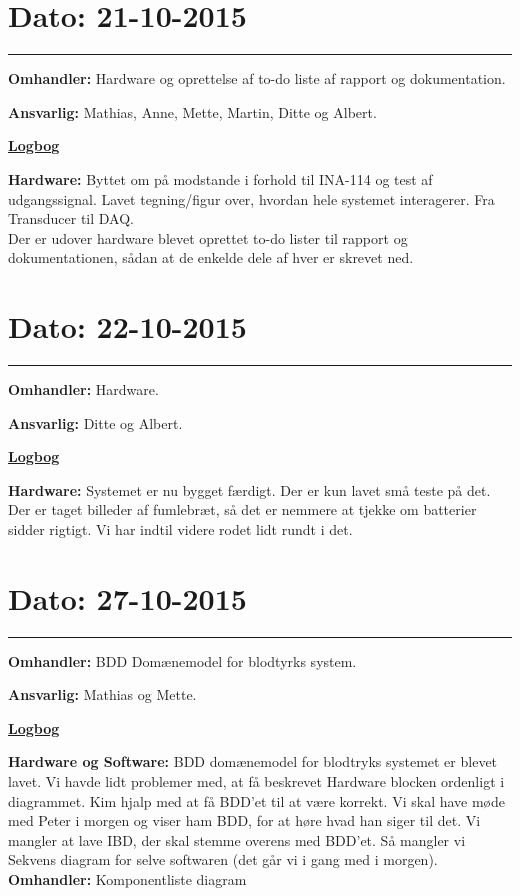 \section{Dato: 21-10-2015}
\hrule
\textbf{Omhandler:} Hardware og oprettelse af to-do liste af rapport og dokumentation.

\textbf{Ansvarlig:} Mathias, Anne, Mette, Martin, Ditte og Albert.

\underline{\textbf{Logbog}}

\textbf{Hardware: }Byttet om på modstande i forhold til INA-114 og test af udgangssignal. Lavet tegning/figur over, hvordan hele systemet interagerer. Fra Transducer til DAQ.  
\\
Der er udover hardware blevet oprettet to-do lister til rapport og dokumentationen, sådan at de enkelde dele af hver er skrevet ned.

\section{Dato: 22-10-2015}
\hrule
\textbf{Omhandler:} Hardware.

\textbf{Ansvarlig:} Ditte og Albert.

\underline{\textbf{Logbog}}

\textbf{Hardware: }Systemet er nu bygget færdigt. Der er kun lavet små teste på det. Der er taget billeder af fumlebræt, så det er nemmere at tjekke om batterier sidder rigtigt. Vi har indtil videre rodet lidt rundt i det.  
\\

\section{Dato: 27-10-2015}
\hrule
\textbf{Omhandler:} BDD Domænemodel for blodtyrks system. 

\textbf{Ansvarlig:} Mathias og Mette.

\underline{\textbf{Logbog}}

\textbf{Hardware og Software: } BDD domænemodel for blodtryks systemet er blevet lavet. Vi havde lidt problemer med, at få beskrevet Hardware blocken ordenligt i diagrammet. Kim hjalp med at få BDD'et til at være korrekt. Vi skal have møde med Peter i morgen og viser ham BDD, for at høre hvad han siger til det. 
Vi mangler at lave IBD, der skal stemme overens med BDD'et. Så mangler vi Sekvens diagram for selve softwaren (det går vi i gang med i morgen).
\\

\textbf{Omhandler:} Komponentliste diagram

